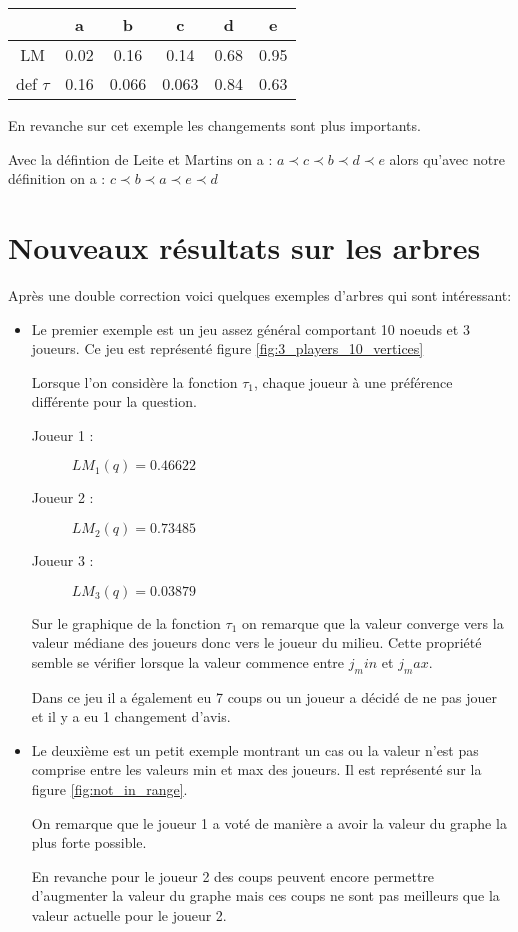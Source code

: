 \documentclass[12pt]{article}
\theoremstyle{defi}
\theoremstyle{not}
\theoremstyle{prob}
\begin{document}
          \begin{tabular}{|c|c|c|c|c|c|}
            \hline
                       & a    & b     & c     & d    & e \\
            \hline
            LM         & 0.02 & 0.16  & 0.14  & 0.68 & 0.95 \\
            \hline
            def $\tau$ & 0.16 & 0.066 & 0.063 & 0.84 & 0.63\\
            \hline
          \end{tabular}

          En revanche sur cet exemple les changements sont plus importants.

          Avec la défintion de Leite et Martins on a : $a \prec c \prec b \prec d \prec e$ alors qu'avec notre définition on a : $c \prec b \prec a \prec e \prec d$

  \section{Nouveaux résultats sur les arbres}
    Après une double correction voici quelques exemples d'arbres qui sont intéressant:\\

    \begin{itemize}
      \item Le premier exemple est un jeu assez général comportant 10 noeuds et 3 joueurs.
        Ce jeu est représenté figure \ref{fig:3_players_10_vertices}

        Lorsque l'on considère la fonction $\tau_1$, chaque joueur à une préférence différente pour la question.
        \begin{description}
          \item[Joueur 1 : ] $LM_1(q) = 0.46622$
          \item[Joueur 2 : ] $LM_2(q) = 0.73485$
          \item[Joueur 3 : ] $LM_3(q) = 0.03879$
        \end{description}

        Sur le graphique de la fonction $\tau_1$ on remarque que la valeur converge vers la valeur médiane des joueurs donc vers le joueur du milieu. Cette propriété semble se vérifier lorsque la valeur commence entre $j_min$ et $j_max$.

        Dans ce jeu il a également eu 7 coups ou un joueur a décidé de ne pas jouer et il y a eu 1 changement d'avis.

      \item Le deuxième est un petit exemple montrant un cas ou la valeur n'est pas comprise entre les valeurs min et max des joueurs.
        Il est représenté sur la figure \ref{fig:not_in_range}.

        On remarque que le joueur 1 a voté de manière a avoir la valeur du graphe la plus forte possible.

        En revanche pour le joueur 2 des coups peuvent encore permettre d'augmenter la valeur du graphe mais ces coups ne sont pas meilleurs que la valeur actuelle pour le joueur 2.
    \end{itemize}
\end{document}

